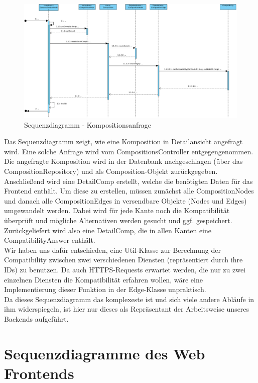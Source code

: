 \begin{figure}[h]
	\centering
	\includegraphics[width=\textwidth]{img/Diagramme/Sequenz/Controller}	
	\caption{Sequenzdiagramm - Kompositionsanfrage}
	\label{fig:sequenz-a}
\end{figure}
\noindent
Das Sequenzdiagramm zeigt, wie eine Komposition in Detailansicht angefragt wird. 
Eine solche Anfrage wird vom CompositionsController entgegengenommen.
Die angefragte Komposition wird in der Datenbank nachgeschlagen (über das CompositionRepository) und als Composition-Objekt zurückgegeben.
Anschließend wird eine DetailComp erstellt, welche die benötigten Daten für das Frontend enthält. 
Um diese zu erstellen, müssen zunächst alle CompositionNodes und danach alle CompositionEdges in versendbare Objekte (Nodes und Edges) umgewandelt werden. 
Dabei wird für jede Kante noch die Kompatibilität überprüft und mögliche Alternativen werden gesucht und ggf. gespeichert. Zurückgeliefert wird also eine DetailComp, die in allen Kanten eine CompatibilityAnswer enthält.\newline
\\ \noindent
Wir haben uns dafür entschieden, eine Util-Klasse zur Berechnung der Compatibility zwischen zwei verschiedenen Diensten (repräsentiert durch ihre IDs) zu benutzen.
Da auch HTTPS-Requests erwartet werden, die nur zu zwei einzelnen Diensten die Kompatibilität erfahren wollen, wäre eine Implementierung dieser Funktion in der Edge-Klasse unpraktisch.\newline
\\ \noindent
Da dieses Sequenzdiagramm das komplexeste ist und sich viele andere Abläufe in ihm widerspiegeln, ist hier nur dieses als Repräsentant der Arbeitsweise unseres Backends aufgeführt.

\newpage
\section*{Sequenzdiagramme des Web Frontends}
